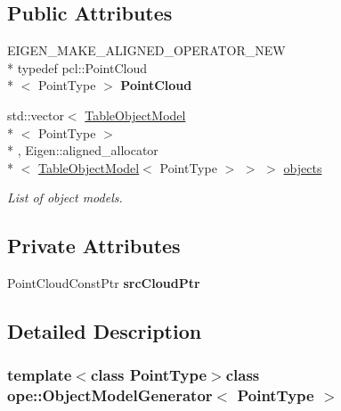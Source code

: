 \subsection*{Public Attributes}
\begin{DoxyCompactItemize}
\item 
\hypertarget{classope_1_1_object_model_generator_a7b1e2e114d902b407a25960d854fbde3}{E\-I\-G\-E\-N\-\_\-\-M\-A\-K\-E\-\_\-\-A\-L\-I\-G\-N\-E\-D\-\_\-\-O\-P\-E\-R\-A\-T\-O\-R\-\_\-\-N\-E\-W \\*
typedef pcl\-::\-Point\-Cloud\\*
$<$ Point\-Type $>$ {\bfseries Point\-Cloud}}\label{classope_1_1_object_model_generator_a7b1e2e114d902b407a25960d854fbde3}

\item 
std\-::vector$<$ \hyperlink{classope_1_1_table_object_model}{Table\-Object\-Model}\\*
$<$ Point\-Type $>$\\*
, Eigen\-::aligned\-\_\-allocator\\*
$<$ \hyperlink{classope_1_1_table_object_model}{Table\-Object\-Model}$<$ Point\-Type $>$ $>$ $>$ \hyperlink{classope_1_1_object_model_generator_acfe3286278478e32bb2a4e7880f777b9}{objects}
\begin{DoxyCompactList}\small\item\em List of object models. \end{DoxyCompactList}\end{DoxyCompactItemize}
\subsection*{Private Attributes}
\begin{DoxyCompactItemize}
\item 
\hypertarget{classope_1_1_object_model_generator_a95b385ae6a94c87d4e8e89a2a6d6b511}{Point\-Cloud\-Const\-Ptr {\bfseries src\-Cloud\-Ptr}}\label{classope_1_1_object_model_generator_a95b385ae6a94c87d4e8e89a2a6d6b511}

\end{DoxyCompactItemize}


\subsection{Detailed Description}
\subsubsection*{template$<$class Point\-Type$>$class ope\-::\-Object\-Model\-Generator$<$ Point\-Type $>$}

